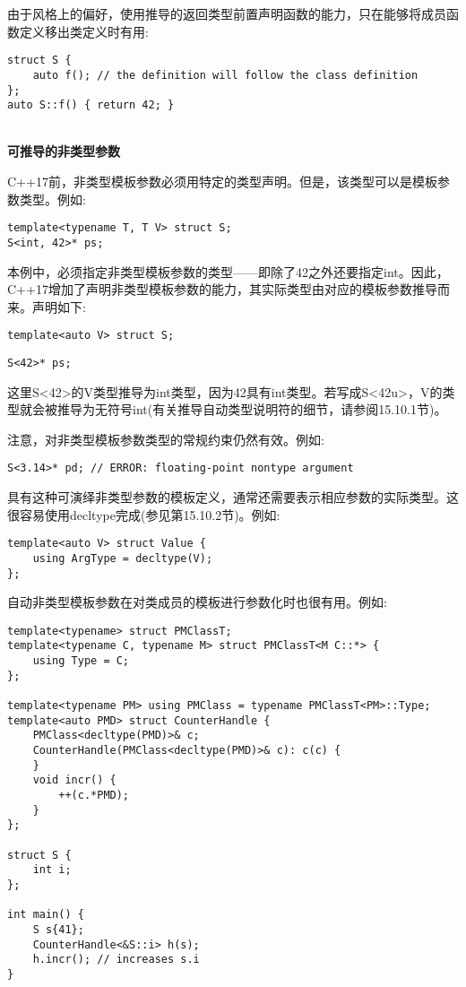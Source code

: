 由于风格上的偏好，使用推导的返回类型前置声明函数的能力，只在能够将成员函数定义移出类定义时有用:

\begin{lstlisting}[style=styleCXX]
struct S {
	auto f(); // the definition will follow the class definition
};
auto S::f() { return 42; }
\end{lstlisting}

\hspace*{\fill} \\ %
\noindent
\textbf{可推导的非类型参数}

C++17前，非类型模板参数必须用特定的类型声明。但是，该类型可以是模板参数类型。例如:

\begin{lstlisting}[style=styleCXX]
template<typename T, T V> struct S;
S<int, 42>* ps;
\end{lstlisting}

本例中，必须指定非类型模板参数的类型——即除了42之外还要指定int。因此，C++17增加了声明非类型模板参数的能力，其实际类型由对应的模板参数推导而来。声明如下:

\begin{lstlisting}[style=styleCXX]
template<auto V> struct S;
\end{lstlisting}


\begin{lstlisting}[style=styleCXX]
S<42>* ps;
\end{lstlisting}

这里S<42>的V类型推导为int类型，因为42具有int类型。若写成S<42u>，V的类型就会被推导为无符号int(有关推导自动类型说明符的细节，请参阅15.10.1节)。

注意，对非类型模板参数类型的常规约束仍然有效。例如:

\begin{lstlisting}[style=styleCXX]
S<3.14>* pd; // ERROR: floating-point nontype argument
\end{lstlisting}

具有这种可演绎非类型参数的模板定义，通常还需要表示相应参数的实际类型。这很容易使用decltype完成(参见第15.10.2节)。例如:

\begin{lstlisting}[style=styleCXX]
template<auto V> struct Value {
	using ArgType = decltype(V);
};
\end{lstlisting}

自动非类型模板参数在对类成员的模板进行参数化时也很有用。例如:

\begin{lstlisting}[style=styleCXX]
template<typename> struct PMClassT;
template<typename C, typename M> struct PMClassT<M C::*> {
	using Type = C;
};

template<typename PM> using PMClass = typename PMClassT<PM>::Type;
template<auto PMD> struct CounterHandle {
	PMClass<decltype(PMD)>& c;
	CounterHandle(PMClass<decltype(PMD)>& c): c(c) {
	}
	void incr() {
		++(c.*PMD);
	}
};

struct S {
	int i;
};

int main() {
	S s{41};
	CounterHandle<&S::i> h(s);
	h.incr(); // increases s.i
}
\end{lstlisting}

